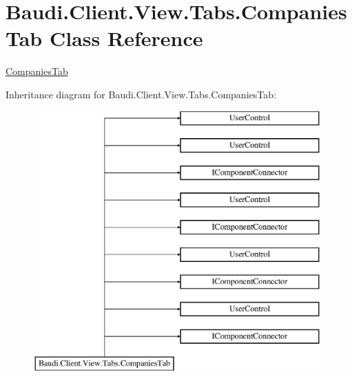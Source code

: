 \hypertarget{class_baudi_1_1_client_1_1_view_1_1_tabs_1_1_companies_tab}{}\section{Baudi.\+Client.\+View.\+Tabs.\+Companies\+Tab Class Reference}
\label{class_baudi_1_1_client_1_1_view_1_1_tabs_1_1_companies_tab}


\hyperlink{class_baudi_1_1_client_1_1_view_1_1_tabs_1_1_companies_tab}{Companies\+Tab}  


Inheritance diagram for Baudi.\+Client.\+View.\+Tabs.\+Companies\+Tab\+:\begin{figure}[H]
\begin{center}
\leavevmode
\includegraphics[height=10.000000cm]{class_baudi_1_1_client_1_1_view_1_1_tabs_1_1_companies_tab}
\end{center}
\end{figure}
